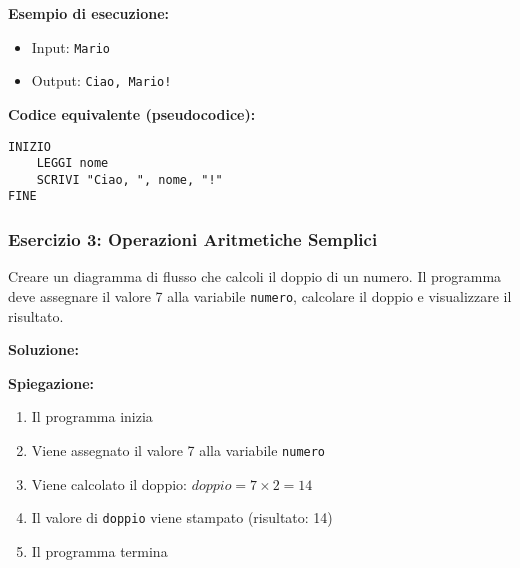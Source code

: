 \documentclass[a4paper,16pt]{article}
\begin{document}
\textbf{Esempio di esecuzione:}
\begin{itemize}
    \item Input: \texttt{Mario}
    \item Output: \texttt{Ciao, Mario!}
\end{itemize}

\textbf{Codice equivalente (pseudocodice):}
\begin{lstlisting}
INIZIO
    LEGGI nome
    SCRIVI "Ciao, ", nome, "!"
FINE
\end{lstlisting}

\newpage
\subsubsection{Esercizio 3: Operazioni Aritmetiche Semplici}

\begin{tcolorbox}[colback=blue!5!white,colframe=blue!75!black,title=Traccia]
Creare un diagramma di flusso che calcoli il doppio di un numero. Il programma deve assegnare il valore 7 alla variabile \texttt{numero}, calcolare il doppio e visualizzare il risultato.
\end{tcolorbox}

\textbf{Soluzione:}

\begin{center}
\end{center}

\textbf{Spiegazione:}
\begin{enumerate}
    \item Il programma inizia
    \item Viene assegnato il valore 7 alla variabile \texttt{numero}
    \item Viene calcolato il doppio: $doppio = 7 \times 2 = 14$
    \item Il valore di \texttt{doppio} viene stampato (risultato: 14)
    \item Il programma termina
\end{enumerate}
\end{document}
